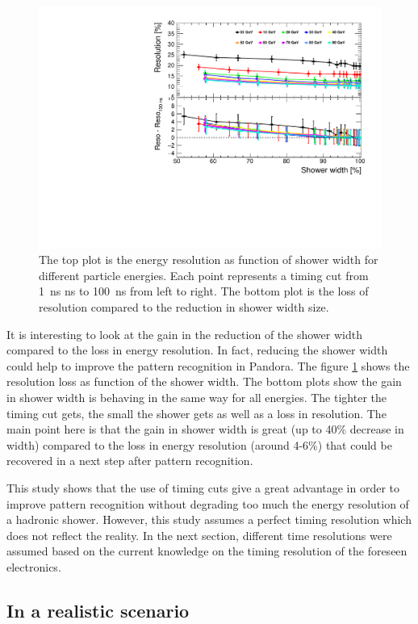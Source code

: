 \begin{figure}[htbp!]
  \centering
  \includegraphics[width=0.7\linewidth]{../Thesis_Plots/ILD/NoSmearing/Plots/ShowerWidth_Resolution_noSmearing}
  \caption{The top plot is the energy resolution as function of shower width for different particle energies. Each point represents a timing cut from \SI{1}{\nano\second} ns to \SI{100}{\nano\second} from left to right. The bottom plot is the loss of resolution compared to the reduction in shower width size.} \label{fig:ShowerWidthResoNoSmearing}
\end{figure}

It is interesting to look at the gain in the reduction of the shower width compared to the loss in energy resolution. In fact, reducing the shower width could help to improve the pattern recognition in Pandora. The figure \ref{fig:ShowerWidthResoNoSmearing} shows the resolution loss as function of the shower width. The bottom plots show the gain in shower width is behaving in the same way for all energies. The tighter the timing cut gets, the small the shower gets as well as a loss in resolution. The main point here is that the gain in shower width is great (up to 40\% decrease in width) compared to the loss in energy resolution (around 4-6\%) that could be recovered in a next step after pattern recognition.

This study shows that the use of timing cuts give a great advantage in order to improve pattern recognition without degrading too much the energy resolution of a hadronic shower. However, this study assumes a perfect timing resolution which does not reflect the reality. In the next section, different time resolutions were assumed based on the current knowledge on the timing resolution of the foreseen electronics.

\subsection{In a realistic scenario}


